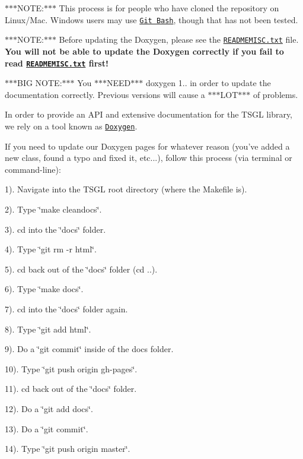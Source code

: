 $\ast$$\ast$$\ast$\-N\-O\-T\-E\-:$\ast$$\ast$$\ast$ This process is for people who have cloned the repository on Linux/\-Mac. Windows users may use \href{https://git-scm.com/download/win}{\tt Git Bash}, though that has not been tested.

$\ast$$\ast$$\ast$\-N\-O\-T\-E\-:$\ast$$\ast$$\ast$ Before updating the Doxygen, please see the \href{https://github.com/Calvin-CS/TSGL/blob/master/READMEMISC.txt}{\tt R\-E\-A\-D\-M\-E\-M\-I\-S\-C.\-txt} file. {\bfseries You will not be able to update the Doxygen correctly if you fail to read \href{https://github.com/Calvin-CS/TSGL/blob/master/READMEMISC.txt}{\tt R\-E\-A\-D\-M\-E\-M\-I\-S\-C.\-txt} first!}

$\ast$$\ast$$\ast$\-B\-I\-G N\-O\-T\-E\-:$\ast$$\ast$$\ast$ You $\ast$$\ast$$\ast$\-N\-E\-E\-D$\ast$$\ast$$\ast$ doxygen 1.. in order to update the documentation correctly. Previous versions will cause a $\ast$$\ast$$\ast$\-L\-O\-T$\ast$$\ast$$\ast$ of problems.

In order to provide an A\-P\-I and extensive documentation for the T\-S\-G\-L library, we rely on a tool known as \href{http://www.stack.nl/~dimitri/doxygen/}{\tt Doxygen}.

If you need to update our Doxygen pages for whatever reason (you've added a new class, found a typo and fixed it, etc...), follow this process (via terminal or command-\/line)\-:

1). Navigate into the T\-S\-G\-L root directory (where the Makefile is).

2). Type \char`\"{}make cleandocs\char`\"{}.

3). cd into the \char`\"{}docs\char`\"{} folder.

4). Type \char`\"{}git rm -\/r html\char`\"{}.

5). cd back out of the \char`\"{}docs\char`\"{} folder (cd ..).

6). Type \char`\"{}make docs\char`\"{}.

7). cd into the \char`\"{}docs\char`\"{} folder again.

8). Type \char`\"{}git add html\char`\"{}.

9). Do a \char`\"{}git commit\char`\"{} inside of the docs folder.

10). Type \char`\"{}git push origin gh-\/pages\char`\"{}.

11). cd back out of the \char`\"{}docs\char`\"{} folder.

12). Do a \char`\"{}git add docs\char`\"{}.

13). Do a \char`\"{}git commit\char`\"{}.

14). Type \char`\"{}git push origin master\char`\"{}. 